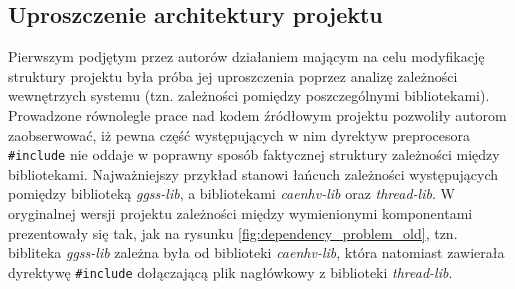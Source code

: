 \subsection{Uproszczenie architektury projektu}
Pierwszym podjętym przez autorów działaniem mającym na celu modyfikację struktury projektu była próba jej uproszczenia poprzez analizę zależności wewnętrzych systemu (tzn. zależności pomiędzy poszczególnymi bibliotekami). Prowadzone równolegle prace nad kodem źródłowym projektu pozwoliły autorom zaobserwować, iż pewna część występujących w nim dyrektyw preprocesora \lstinline{#include} nie oddaje w poprawny sposób faktycznej struktury zależności między bibliotekami. Najważniejszy przykład stanowi łańcuch zależności występujących pomiędzy biblioteką \emph{ggss-lib}, a bibliotekami \emph{caenhv-lib} oraz \emph{thread-lib}. W oryginalnej wersji projektu zależności między wymienionymi komponentami prezentowały się tak, jak na rysunku \ref{fig:dependency_problem_old}, tzn. bibliteka \emph{ggss-lib} zależna była od biblioteki \emph{caenhv-lib}, która natomiast zawierała dyrektywę \lstinline{#include} dołączającą plik nagłówkowy z biblioteki \emph{thread-lib}.



